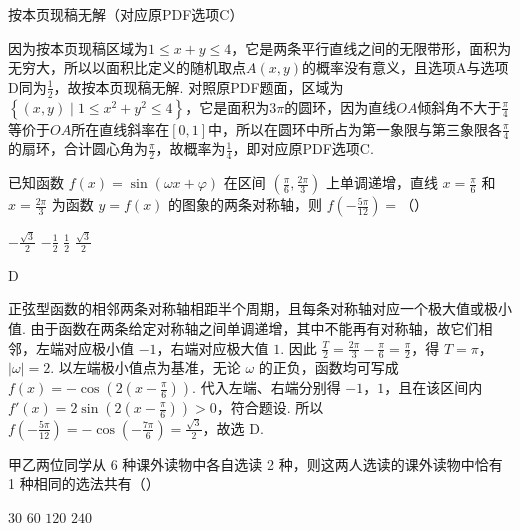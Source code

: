 \begin{answer}
按本页现稿无解（对应原PDF选项C）
\end{answer}

\begin{solution}
因为按本页现稿区域为\(1\le x+y\le 4\)，它是两条平行直线之间的无限带形，面积为无穷大，所以以面积比定义的随机取点\(A\left(x,y\right)\)的概率没有意义，且选项A与选项D同为\(\frac12\)，故按本页现稿无解. 对照原PDF题面，区域为\(\left\{\left(x,y\right)\mid 1\le x^{2}+y^{2}\le 4\right\}\)，它是面积为\(3\pi\)的圆环，因为直线\(OA\)倾斜角不大于\(\frac{\pi}{4}\)等价于\(OA\)所在直线斜率在\(\left[0,1\right]\)中，所以在圆环中所占为第一象限与第三象限各\(\frac{\pi}{4}\)的扇环，合计圆心角为\(\frac{\pi}{2}\)，故概率为\(\frac{1}{4}\)，即对应原PDF选项C.
\end{solution}

\begin{problem}
已知函数 \(f(x)=\sin(\omega x+\varphi)\) 在区间 \(\left(\frac\pi6,\frac{2\pi}3\right)\) 上单调递增，直线 \(x=\frac\pi6\) 和 \(x=\frac{2\pi}3\) 为函数 \(y=f(x)\) 的图象的两条对称轴，则 \(f\left(-\frac{5\pi}{12}\right)=\)（\quad）

\choices
    {\(-\frac{\sqrt3}{2}\)}
    {\(-\frac12\)}
    {\(\frac12\)}
    {\(\frac{\sqrt3}{2}\)}
\end{problem}

\begin{answer}
D
\end{answer}

\begin{solution}
正弦型函数的相邻两条对称轴相距半个周期，且每条对称轴对应一个极大值或极小值. 由于函数在两条给定对称轴之间单调递增，其中不能再有对称轴，故它们相邻，左端对应极小值 \(-1\)，右端对应极大值 \(1\). 因此 \(\frac{T}{2}=\frac{2\pi}{3}-\frac{\pi}{6}=\frac{\pi}{2}\)，得 \(T=\pi\)，\(\lvert\omega\rvert=2\). 以左端极小值点为基准，无论 \(\omega\) 的正负，函数均可写成 \(f(x)=-\cos\left(2\left(x-\frac{\pi}{6}\right)\right)\). 代入左端、右端分别得 \(-1\)，\(1\)，且在该区间内 \(f'(x)=2\sin\left(2\left(x-\frac{\pi}{6}\right)\right)>0\)，符合题设. 所以 \(f\left(-\frac{5\pi}{12}\right)=-\cos\left(-\frac{7\pi}{6}\right)=\frac{\sqrt3}{2}\)，故选 D.
\end{solution}

\begin{problem}
甲乙两位同学从 6 种课外读物中各自选读 2 种，则这两人选读的课外读物中恰有 1 种相同的选法共有（\quad）

\choices
    {\(30\)}
    {\(60\)}
    {\(120\)}
    {\(240\)}
\end{problem}

